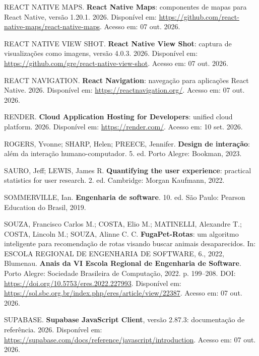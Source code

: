 \begin{flushleft}
\vspace{12pt}
\noindent REACT NATIVE MAPS. \textbf{React Native Maps}: componentes de mapas para React Native, versão 1.20.1. 2026. Disponível em: \url{https://github.com/react-native-maps/react-native-maps}. Acesso em: 07 out. 2026.

\vspace{12pt}
\noindent REACT NATIVE VIEW SHOT. \textbf{React Native View Shot}: captura de visualizações como imagens, versão 4.0.3. 2026. Disponível em: \url{https://github.com/gre/react-native-view-shot}. Acesso em: 07 out. 2026.

\vspace{12pt}
\noindent REACT NAVIGATION. \textbf{React Navigation}: navegação para aplicações React Native. 2026. Disponível em: \url{https://reactnavigation.org/}. Acesso em: 07 out. 2026.

\vspace{12pt}
\noindent RENDER. \textbf{Cloud Application Hosting for Developers}: unified cloud platform. 2026. Disponível em: \url{https://render.com/}. Acesso em: 10 set. 2026.

\vspace{12pt}
\noindent ROGERS, Yvonne; SHARP, Helen; PREECE, Jennifer. \textbf{Design de interação}: além da interação humano-computador. 5. ed. Porto Alegre: Bookman, 2023.

\vspace{12pt}
\noindent SAURO, Jeff; LEWIS, James R. \textbf{Quantifying the user experience}: practical statistics for user research. 2. ed. Cambridge: Morgan Kaufmann, 2022.

\vspace{12pt}
\noindent SOMMERVILLE, Ian. \textbf{Engenharia de software}. 10. ed. São Paulo: Pearson Education do Brasil, 2019.

\vspace{12pt}
\noindent SOUZA, Francisco Carlos M.; COSTA, Elio M.; MATINELLI, Alexandre T.; COSTA, Lincoln M.; SOUZA, Alinne C. C. \textbf{FugaPet-Rotas}: um algoritmo inteligente para recomendação de rotas visando buscar animais desaparecidos. In: ESCOLA REGIONAL DE ENGENHARIA DE SOFTWARE, 6., 2022, Blumenau. \textbf{Anais da VI Escola Regional de Engenharia de Software}. Porto Alegre: Sociedade Brasileira de Computação, 2022. p. 199--208. DOI: \url{https://doi.org/10.5753/eres.2022.227993}. Disponível em: \url{https://sol.sbc.org.br/index.php/eres/article/view/22387}. Acesso em: 07 out. 2026.

\vspace{12pt}
\noindent SUPABASE. \textbf{Supabase JavaScript Client}, versão 2.87.3: documentação de referência. 2026. Disponível em: \url{https://supabase.com/docs/reference/javascript/introduction}. Acesso em: 07 out. 2026.


\end{flushleft}
